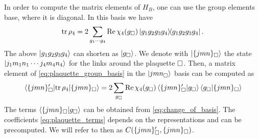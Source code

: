 In order to compute the matrix elements of $H_B$, one can use the group elements base, where it is diagonal.
In this basis we have
\begin{equation}
    \tr \rho_4 =
    2 \sum_{g_1 \cdots g_4} \Re \chi_4(g_{\square}) \ketbra{g_1 g_2 g_3 g_4}{g_1 g_2 g_3 g_4}.
    \label{eq:plaquette_group_basis}
\end{equation}
The above $\ket{g_1 g_2 g_3 g_4}$ can shorten as $\ket{g_{\square}}$.
We denote with $\ket{ \{jmn\}_{\square}}$ the state $\ket{j_1 m_1 n_1 \cdots j_4 m_4 n_4}$ for the links around the plaquette $\square$.
Then, a matrix element of \eqref{eq:plaquette_group_basis} in the $\ket{ {jmn}_{\square}}$ basis can be computed as
\begin{equation}
    \mel{ \{jmn\}_{\square}^{\prime}}{ \tr \rho_4}{ \{jmn\}_{\square}} =
    2 \sum_{g_{\square}} \Re \chi_4 (g_{\square})
        \braket{ \{jmn\}_{\square}^{\prime} }{g_{\square}}
        \braket{g_{\square}}{ \{jmn\}_{\square} }
    \label{eq:plaquette_terms}
\end{equation}
The terms $\braket{ \{jmn\}_{\square} }{ g_{\square} }$ can be obtained from \eqref{eq:change_of_basis}.
The coefficients \eqref{eq:plaquette_terms} depends on the representations and can be precomputed.
We will refer to then as $C( \{jmn\}_{\square}^{\prime}, \{jmn\}_{\square})$.

